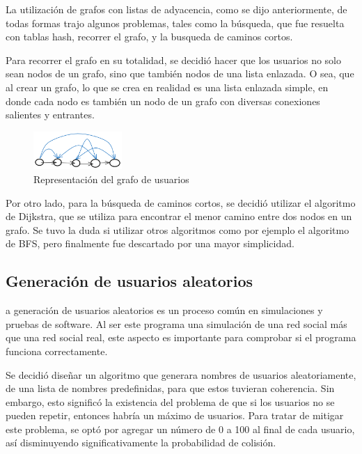 \documentclass[9pt,letterpaper,onecolumn]{rho-class/rho}
\begin{document}
\vspace{0.5cm}

La utilización de grafos con listas de adyacencia, como se dijo anteriormente, de todas formas trajo algunos problemas, tales como la búsqueda, que fue resuelta con tablas hash, recorrer el grafo, y la busqueda de caminos cortos.

\vspace{0.5cm}

Para recorrer el grafo en su totalidad, se decidió hacer que los usuarios no solo sean nodos de un grafo, sino que también nodos de una lista enlazada. O sea, que al crear un grafo, lo que se crea en realidad es una lista enlazada simple, en donde cada nodo es también un nodo de un grafo con diversas conexiones salientes y entrantes. 

\begin{figure}[H]
    \centering
    \includegraphics[width=0.3\textwidth]{figures/grafo.png}
    \caption{Representación del grafo de usuarios}
\end{figure}

Por otro lado, para la búsqueda de caminos cortos, se decidió utilizar el algoritmo de Dijkstra, que se utiliza para encontrar el menor camino entre dos nodos en un grafo. Se tuvo la duda si utilizar otros algoritmos como por ejemplo el algoritmo de BFS, pero finalmente fue descartado por una mayor simplicidad.

\subsection{Generación de usuarios aleatorios}
a generación de usuarios aleatorios es un proceso común en simulaciones y pruebas de software. Al ser este programa una simulación de una red social más que una red social real, este aspecto es importante para comprobar si el programa funciona correctamente.

\vspace{0.5cm}

Se decidió diseñar un algoritmo que generara nombres de usuarios aleatoriamente, de una lista de nombres predefinidas, para que estos tuvieran coherencia. Sin embargo, esto significó la existencia del problema de que si los usuarios no se pueden repetir, entonces habría un máximo de usuarios. Para tratar de mitigar este problema, se optó por agregar un número de 0 a 100 al final de cada usuario, así disminuyendo significativamente la probabilidad de colisión.
\end{document}
